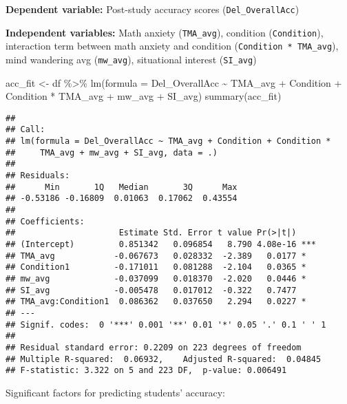 \documentclass[
]{article}
\newenvironment{Shaded}{\begin{snugshade}}{\end{snugshade}}
\newcommand{\AttributeTok}[1]{\textcolor[rgb]{0.77,0.63,0.00}{#1}}
\newcommand{\FunctionTok}[1]{\textcolor[rgb]{0.00,0.00,0.00}{#1}}
\newcommand{\NormalTok}[1]{#1}
\newcommand{\OtherTok}[1]{\textcolor[rgb]{0.56,0.35,0.01}{#1}}
\newcommand{\SpecialCharTok}[1]{\textcolor[rgb]{0.00,0.00,0.00}{#1}}
\begin{document}
\textbf{Dependent variable:} Post-study accuracy scores
(\texttt{Del\_OverallAcc})

\textbf{Independent variables:} Math anxiety (\texttt{TMA\_avg}),
condition (\texttt{Condition}), interaction term between math anxiety
and condition (\texttt{Condition\ *\ TMA\_avg}), mind wandering avg
(\texttt{mw\_avg}), situational interest (\texttt{SI\_avg})

\begin{Shaded}
\begin{Highlighting}[]
\NormalTok{acc\_fit }\OtherTok{\textless{}{-}}\NormalTok{ df }\SpecialCharTok{\%\textgreater{}\%} 
  \FunctionTok{lm}\NormalTok{(}\AttributeTok{formula =}\NormalTok{ Del\_OverallAcc }\SpecialCharTok{\textasciitilde{}}\NormalTok{ TMA\_avg }\SpecialCharTok{+}\NormalTok{ Condition }\SpecialCharTok{+}\NormalTok{  Condition }\SpecialCharTok{*}\NormalTok{ TMA\_avg }\SpecialCharTok{+}\NormalTok{ mw\_avg }\SpecialCharTok{+}\NormalTok{ SI\_avg) }
\FunctionTok{summary}\NormalTok{(acc\_fit)}
\end{Highlighting}
\end{Shaded}

\begin{verbatim}
## 
## Call:
## lm(formula = Del_OverallAcc ~ TMA_avg + Condition + Condition * 
##     TMA_avg + mw_avg + SI_avg, data = .)
## 
## Residuals:
##      Min       1Q   Median       3Q      Max 
## -0.53186 -0.16809  0.01063  0.17062  0.43554 
## 
## Coefficients:
##                     Estimate Std. Error t value Pr(>|t|)    
## (Intercept)         0.851342   0.096854   8.790 4.08e-16 ***
## TMA_avg            -0.067673   0.028332  -2.389   0.0177 *  
## Condition1         -0.171011   0.081288  -2.104   0.0365 *  
## mw_avg             -0.037099   0.018370  -2.020   0.0446 *  
## SI_avg             -0.005478   0.017012  -0.322   0.7477    
## TMA_avg:Condition1  0.086362   0.037650   2.294   0.0227 *  
## ---
## Signif. codes:  0 '***' 0.001 '**' 0.01 '*' 0.05 '.' 0.1 ' ' 1
## 
## Residual standard error: 0.2209 on 223 degrees of freedom
## Multiple R-squared:  0.06932,    Adjusted R-squared:  0.04845 
## F-statistic: 3.322 on 5 and 223 DF,  p-value: 0.006491
\end{verbatim}

Significant factors for predicting students' accuracy:
\end{document}
